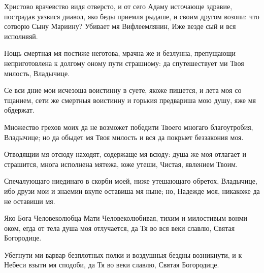 \begin{mymulticols}
Христово врачевство видя отверсто, и от сего Адаму источающе здравие, пострадав уязвися диавол, яко беды приемля рыдаше, и своим другом возопи: что сотворю Сыну Мариину? Убивает мя Вифлеемлянин, Иже везде сый и вся исполняяй.




Нощь смертная мя постиже неготова, мрачна же и безлунна, препущающи неприготовлена к долгому оному пути страшному: да спутешествует ми Твоя милость, Владычице. 


Се вси дние мои исчезоша воистинну в суете, якоже пишется, и лета моя со тщанием, сети же смертныя воистинну и горькия предвариша мою душу, яже мя обдержат. 


Множество грехов моих да не возможет победити Твоего многаго благоутробия, Владычице; но да обыдет мя Твоя милость и вся да покрыет беззакония моя. 

\slavan

Отводящии мя отсюду находят, содержаще мя всюду: душа же моя отлагает и страшится, многа исполнена мятежа, юже утеши, Чистая, явлением Твоим. 

\inynen

Спечалующаго ниединаго в скорби моей, ниже утешающаго обретох, Владычице, ибо друзи мои и знаемии вкупе оставиша мя ныне; но, Надежде моя, никакоже да не оставиши мя.




Яко Бога Человеколюбца Мати Человеколюбивая, тихим и милостивым вонми оком, егда от тела душа моя отлучается, да Тя во вся веки славлю, Святая Богородице. 


Убегнути ми варвар безплотных полки и воздушныя бездны возникнути, и к Небеси взыти мя сподоби, да Тя во веки славлю, Святая Богородице. 


\end{mymulticols}
